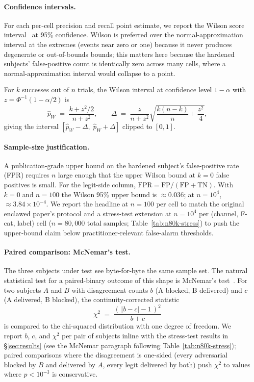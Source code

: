 \documentclass[11pt]{article}
\begin{document}
\paragraph{Confidence intervals.} For each per-cell precision and
recall point estimate, we report the Wilson score
interval~\cite{Wilson1927} at 95\% confidence. Wilson is preferred
over the normal-approximation interval at the extremes (events
near zero or one) because it never produces degenerate or
out-of-bounds bounds; this matters here because the hardened
subjects' false-positive count is identically zero across many
cells, where a normal-approximation interval would collapse to a
point.

For $k$ successes out of $n$ trials, the Wilson interval at
confidence level $1-\alpha$ with $z = \Phi^{-1}(1-\alpha/2)$ is
\begin{equation}
\widehat{p}_W \;=\; \frac{k + z^2/2}{n + z^2}, \qquad
\Delta \;=\; \frac{z}{n + z^2}\sqrt{\frac{k(n-k)}{n} + \frac{z^2}{4}},
\label{eq:wilson}
\end{equation}
giving the interval $[\widehat{p}_W - \Delta,\; \widehat{p}_W + \Delta]$
clipped to $[0, 1]$.

\paragraph{Sample-size justification.} A publication-grade upper bound
on the hardened subject's false-positive rate (FPR) requires $n$
large enough that the upper Wilson bound at $k = 0$ false positives
is small. For the legit-side column,
$\mathrm{FPR} = \mathrm{FP}/(\mathrm{FP}+\mathrm{TN})$. With $k=0$
and $n=100$ the Wilson 95\% upper bound is $\approx 0.036$; at
$n=10^4$, $\approx 3.84 \times 10^{-4}$. We report the headline at
$n = 100$ per cell to match the original enclawed paper's protocol
and a stress-test extension at $n = 10^4$ per (channel, F-cat,
label) cell ($n = 80{,}000$ total samples; Table~\ref{tab:n80k-stress})
to push the upper-bound claim below practitioner-relevant
false-alarm thresholds.

\paragraph{Paired comparison: McNemar's test.} The three subjects
under test see byte-for-byte the same sample set. The natural
statistical test for a paired-binary outcome of this shape is
McNemar's test~\cite{McNemar1947}. For two subjects $A$ and $B$
with disagreement counts $b$ (A blocked, B delivered) and $c$ (A
delivered, B blocked), the continuity-corrected statistic
\begin{equation}
\chi^2 \;=\; \frac{(\,|b-c| - 1\,)^2}{b + c}
\label{eq:mcnemar}
\end{equation}
is compared to the chi-squared distribution with one degree of
freedom. We report $b$, $c$, and $\chi^2$ per pair of subjects
inline with the stress-test results in \S\ref{sec:results} (see
the McNemar paragraph following Table~\ref{tab:n80k-stress});
paired comparisons where the disagreement is one-sided (every
adversarial blocked by $B$ and delivered by $A$, every legit
delivered by both) push $\chi^2$ to values where $p < 10^{-3}$
is conservative.
\end{document}
